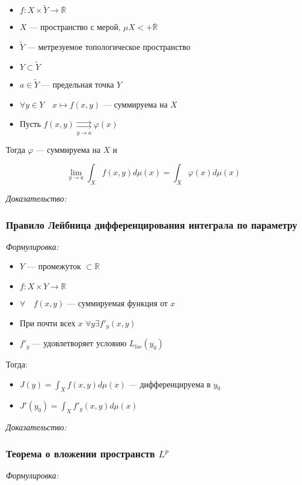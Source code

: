 \documentclass{article}
\def\dbl{\,\,}
\def\rsh#1{\underset{#1}{\rightrightarrows}}
\def\rinf{\overline{\mathbb{R}}}
\begin{document}
\begin{itemize}
    \item $f: X \times \tilde{Y} \rightarrow \rinf$
    \item $X$ --- пространство с мерой, $\mu X < + \rinf$
    \item $\tilde{Y}$ --- метрезуемое топологическое пространство
    \item $Y \subset \tilde{Y}$
    \item $a \in \tilde{Y}$ --- предельная точка  $Y$
    \item $\forall y \in Y \quad x \mapsto f(x, y)$ --- суммируема на $X$
    \item Пусть $f(x, y) \rsh{y \rightarrow a} \varphi(x)$
\end{itemize}

Тогда $\varphi$ --- суммируема на $X$ и 

\[\lim_{y \rightarrow a} \int_{X} f(x, y) d \mu(x) = \int_{X} \varphi(x) d \mu(x)\]
 
\textit{Доказательство:}

\subsubsection{Правило Лейбница дифференцирования интеграла по параметру}
\textit{Формулировка:}

\begin{itemize}
    \item $Y$ --- промежуток $\subset \mathbb{R}$
    \item $f: X \times Y \rightarrow \mathbb{R}$
    \item $\forall \quad f(x, y)$ --- суммируемая функция от $x$
    \item При почти всех $x \dbl \forall y \exists f'_y(x, y)$
    \item $f'_y$ --- удовлетворяет условию $L_{loc}(y_0)$
\end{itemize}

Тогда:

\begin{itemize}
    \item $J(y) = \int_{X} f(x, y) d\mu(x)$ --- дифференцируема в $y_0$
    \item $J'(y_0) = \int_{X} f'_y(x, y) d \mu(x)$
\end{itemize}

\textit{Доказательство:}

\subsubsection{Теорема о вложении пространств $L^p$}
\textit{Формулировка:}
\end{document}
